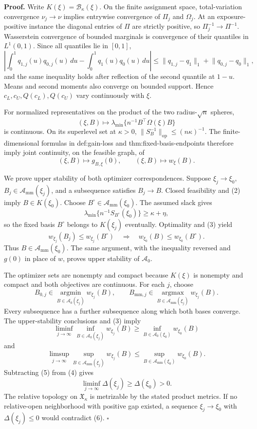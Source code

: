 \textbf{Proof.}
Write \(K(\xi)=\mathcal B_\kappa(\xi)\). On the finite assignment space, total-variation convergence \(\nu_j\to\nu\) implies entrywise convergence of \(\Pi_j\) and \(\Omega_j\). At an exposure-positive instance the diagonal entries of \(\Pi\) are strictly positive, so \(\Pi_j^{-1}\to\Pi^{-1}\). Wasserstein convergence of bounded marginals is convergence of their quantiles in \(L^1(0,1)\). Since all quantiles lie in \([0,1]\),
\[
\left|\int_0^1 q_{1,j}(u)q_{0,j}(u)\,du-
\int_0^1 q_1(u)q_0(u)\,du\right|
\le\lVert q_{1,j}-q_1\rVert_1+\lVert q_{0,j}-q_0\rVert_1, \tag{1}
\]
and the same inequality holds after reflection of the second quantile at \(1-u\). Means and second moments also converge on bounded support. Hence \(c_L,c_U,Q(c_L),Q(c_U)\) vary continuously with \(\xi\).

For normalized representatives on the product of the two radius-\(\sqrt n\) spheres,
\[
(\xi,B)\longmapsto\lambda_{\min}\{n^{-1}B^{\top}\Omega(\xi)B\} \tag{2}
\]
is continuous. On its superlevel set at \(\kappa>0\), \(\lVert S_B^{-1}\rVert_{\mathrm{op}}\le(n\kappa)^{-1}\). The finite-dimensional formulas in def:gain-loss and thm:fixed-basis-endpoints therefore imply joint continuity, on the feasible graph, of
\[
(\xi,B)\longmapsto g_{B,\xi}(0),
\qquad
(\xi,B)\longmapsto w_\xi(B). \tag{3}
\]

We prove upper stability of both optimizer correspondences. Suppose \(\xi_j\to\xi_0\), \(B_j\in\mathcal A_{\mathrm{mm}}(\xi_j)\), and a subsequence satisfies \(B_j\to B\). Closed feasibility and (2) imply \(B\in K(\xi_0)\). Choose \(B^\circ\in\mathcal A_{\mathrm{mm}}(\xi_0)\). The assumed slack gives
\[
\lambda_{\min}\{n^{-1}S_{B^\circ}(\xi_0)\}\ge\kappa+\eta,
\]
so the fixed basis \(B^\circ\) belongs to \(K(\xi_j)\) eventually. Optimality and (3) yield
\[
w_{\xi_j}(B_j)\le w_{\xi_j}(B^\circ)
\quad\Longrightarrow\quad
w_{\xi_0}(B)\le w_{\xi_0}(B^\circ).
\]
Thus \(B\in\mathcal A_{\mathrm{mm}}(\xi_0)\). The same argument, with the inequality reversed and \(g(0)\) in place of \(w\), proves upper stability of \(\mathcal A_0\).

The optimizer sets are nonempty and compact because \(K(\xi)\) is nonempty and compact and both objectives are continuous. For each \(j\), choose
\[
B_{0,j}\in\operatorname*{argmin}_{B\in\mathcal A_0(\xi_j)}w_{\xi_j}(B),
\qquad
B_{\mathrm{mm},j}\in\operatorname*{argmax}_{B\in\mathcal A_{\mathrm{mm}}(\xi_j)}w_{\xi_j}(B).
\]
Every subsequence has a further subsequence along which both bases converge. The upper-stability conclusions and (3) imply
\[
\liminf_{j\to\infty}\inf_{B\in\mathcal A_0(\xi_j)}w_{\xi_j}(B)
\ge\inf_{B\in\mathcal A_0(\xi_0)}w_{\xi_0}(B) \tag{4}
\]
and
\[
\limsup_{j\to\infty}\sup_{B\in\mathcal A_{\mathrm{mm}}(\xi_j)}w_{\xi_j}(B)
\le\sup_{B\in\mathcal A_{\mathrm{mm}}(\xi_0)}w_{\xi_0}(B). \tag{5}
\]
Subtracting (5) from (4) gives
\[
\liminf_{j\to\infty}\Delta(\xi_j)\ge\Delta(\xi_0)>0. \tag{6}
\]
The relative topology on \(\mathfrak X_\kappa\) is metrizable by the stated product metrics. If no relative-open neighborhood with positive gap existed, a sequence \(\xi_j\to\xi_0\) with \(\Delta(\xi_j)\le0\) would contradict (6). \(\square\)